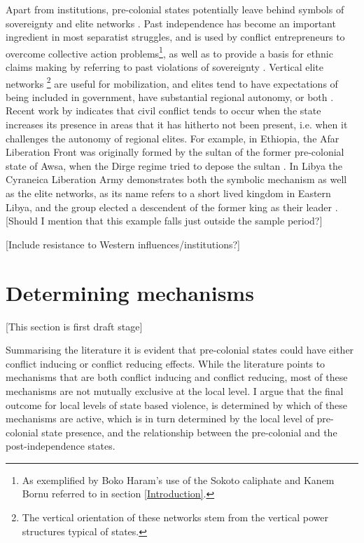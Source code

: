 \documentclass[12pt]{article}
\begin{document}
Apart from institutions, pre-colonial states potentially leave behind symbols of
sovereignty and elite networks \citep{Wishman}. Past independence has become an
important ingredient in most separatist struggles, and is used by conflict
entrepreneurs to overcome collective action problems\footnote{As exemplified by
Boko Haram's use of the Sokoto caliphate and Kanem Bornu referred to in section
\ref{Introduction}.}, as well as to provide a basis for ethnic claims making by
referring to past violations of sovereignty \citep{Ahram2019, Shelef2016}.
Vertical elite networks \footnote{The vertical orientation of these networks
stem from the vertical power structures typical of states.} are useful for
mobilization, and elites tend to have expectations of being included in
government, have substantial regional autonomy, or both \citep{Wishman}. Recent
work by \citet{Ying_2020} indicates that civil conflict tends to occur when the
state increases its presence in areas that it has hitherto not been present,
i.e. when it challenges the autonomy of regional elites. For example, in
Ethiopia, the Afar Liberation Front was originally formed by the sultan of the
former pre-colonial state of Awsa, when the Dirge regime tried to depose the
sultan \citep{Shehim1985, Hanfare2011}.  In Libya the Cyraneica Liberation Army
demonstrates both the symbolic mechanism as well as the elite networks, as its
name refers to a short lived kingdom in Eastern Libya, and the group elected a
descendent of the former king as their leader \citep{Ahram2019}. [Should I
mention that this example falls just outside the sample period?]

 [Include resistance to Western influences/institutions?]

\section{Determining mechanisms} \label{Determining mechanisms} 

[This section is first draft stage]

Summarising the literature it is evident that pre-colonial states could have
either conflict inducing or conflict reducing effects. While the literature
points to mechanisms that are both conflict inducing and conflict reducing, most
of these mechanisms are not mutually exclusive at the local level. I argue that
the final outcome for local levels of state based violence, is determined by
which of these mechanisms are active, which is in turn determined by the local
level of pre-colonial state presence, and the relationship between the
pre-colonial and the post-independence states.
\end{document}
